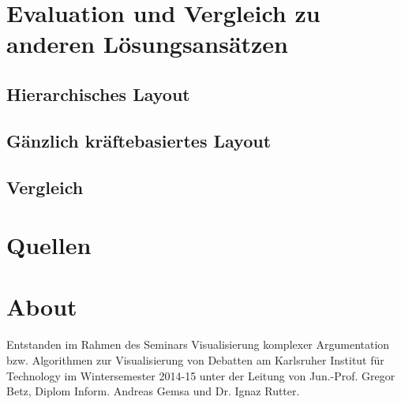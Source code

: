 \documentclass[a4paper, oneside]{scrartcl}
\begin{document}
\section{Evaluation und Vergleich zu anderen Lösungsansätzen}
\subsection{Hierarchisches Layout}
\subsection{Gänzlich kräftebasiertes Layout} %

\subsection{Vergleich}
% 

\section{Quellen}


\section*{About}
Entstanden im Rahmen des Seminars Visualisierung komplexer Argumentation bzw. Algorithmen zur Visualisierung von Debatten 
am Karlsruher Institut für Technology im Wintersemester 2014-15 unter der Leitung von 
Jun.-Prof. Gregor Betz, Diplom Inform. Andreas Gemsa und Dr. Ignaz Rutter.


\end{document}
